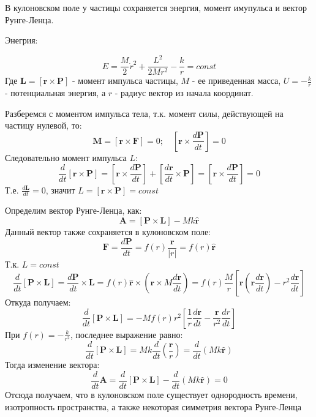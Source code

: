 \documentclass{article}
\begin{document}
 
В кулоновском поле у частицы сохраняется энергия, момент имупульса и вектор Рунге-Ленца. 

Энегрия: 

\begin{equation*}
E = \frac{M}{2} \dot{r}^2 + \frac{L^2}{2Mr^2} - \frac{k}{r} = const
\end{equation*}
Где $\mathbf {L} = [\mathbf r \times \mathbf P ]$ - момент импульса частицы, $M$ - ее приведенная масса, $U = - \frac{k}{r}$ - потенциальная энергия, а $r$ - радиус вектор из начала координат. 

Разберемся с моментом импульса тела, т.к. момент силы, действующей на частицу нулевой, то:
\begin{equation*}
\mathbf {M} = [\mathbf r \times \mathbf F ] = 0 ; \quad  [\mathbf r \times \frac{d \mathbf P}{dt} ] = 0
\end{equation*}
Следовательно момент импульса $L$:
\begin{equation*}
\frac{d}{dt} [\mathbf r \times \mathbf P ] = [\mathbf r \times \frac{d \mathbf P}{dt} ] +  [\frac{d\mathbf r}{dt} \times \mathbf P] = [\mathbf r \times \frac{d \mathbf P}{dt} ] = 0
\end{equation*}
Т.е. $\frac{d\mathbf L}{dt} = 0$, значит $L = [\mathbf r \times \mathbf P ]= const$

Определим вектор Рунге-Ленца, как:
\begin{equation*}
\mathbf A = [\mathbf P \times \mathbf L] - Mk\widehat{\mathbf r}
\end{equation*}
Данный вектор также сохраняется в кулоновском поле:
\begin{equation*}
\mathbf F =\frac{d \mathbf P}{dt} = f(r)\frac{\mathbf r}{|r|} = f(r)\widehat{\mathbf r}
\end{equation*}
Т.к. $L = const$
\begin{equation*}
\frac{d}{dt} [\mathbf P \times \mathbf L ] = \frac{d \mathbf P}{dt} \times \mathbf L =  f(r)\widehat{\mathbf r} \times \left(\mathbf r \times M \frac{d\mathbf r}{dt} \right) =  f(r)\frac{M}{r}\left[ \mathbf r\left(\mathbf r \frac{d\mathbf r}{dt}\right) - r^2\frac{d\mathbf r}{dt} \right]
\end{equation*}
Откуда получаем:
\begin{equation*}
\frac{d}{dt} [\mathbf P \times \mathbf L ] = -M f(r) r^2 \left[\frac{1}{r}\frac{d\mathbf r}{dt} - \frac{\mathbf r}{r^2}\frac{dr}{dt}  \right]
\end{equation*}
При $f(r) = -\frac{k}{r^2}$, последнее выражение равно:
\begin{equation*}
\frac{d}{dt} [\mathbf P \times \mathbf L ] = Mk\frac{d}{dt}\left( \frac{\mathbf r}{r}\right) = \frac{d}{dt}(Mk\widehat{\mathbf r})
\end{equation*}
Тогда изменение вектора:
\begin{equation*}
\frac{d}{dt}\mathbf A = \frac{d}{dt} [\mathbf P \times \mathbf L ] - \frac{d}{dt}(Mk\widehat{\mathbf r}) = 0
\end{equation*}
Отсюда получаем, что в кулоновском поле существует однородность времени, изотропность пространства, а также некоторая симметрия вектора Рунге-Ленца
\end{document}
